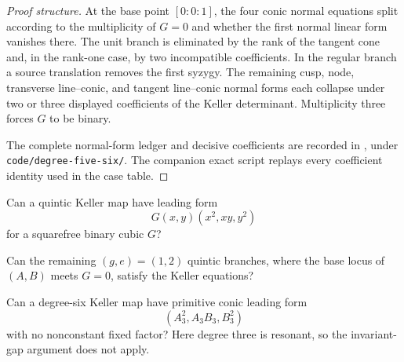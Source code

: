 \begin{proof}[Proof structure]
At the base point \([0:0:1]\), the four conic normal equations split
according to the multiplicity of \(G=0\) and whether the first normal linear
form vanishes there.  The unit branch is eliminated by the rank of the
tangent cone and, in the rank-one case, by two incompatible coefficients.
In the regular branch a source translation removes the first syzygy.
The remaining cusp, node, transverse line--conic, and tangent line--conic
normal forms each collapse under two or three displayed coefficients of the
Keller determinant.  Multiplicity three forces \(G\) to be binary.

The complete normal-form ledger and decisive coefficients are recorded in
, under
\texttt{code/degree-five-six/}.  The companion exact script replays every
coefficient identity used in the case table.
\end{proof}

\begin{question}
\label{q:binary-quintic-overlap}
Can a quintic Keller map have leading form
\[
G(x,y)(x^2,xy,y^2)
\]
for a squarefree binary cubic \(G\)?
\end{question}

\begin{question}
\label{q:degree-five-fixed-factor-basepoints}
Can the remaining \((g,e)=(1,2)\) quintic branches, where the base locus of
\((A,B)\) meets \(G=0\), satisfy the Keller equations?
\end{question}

\begin{question}
\label{q:primitive-sextic-conic}
Can a degree-six Keller map have primitive conic leading form
\[
(A_3^2,A_3B_3,B_3^2)
\]
with no nonconstant fixed factor?  Here degree three is resonant, so the
invariant-gap argument does not apply.
\end{question}

